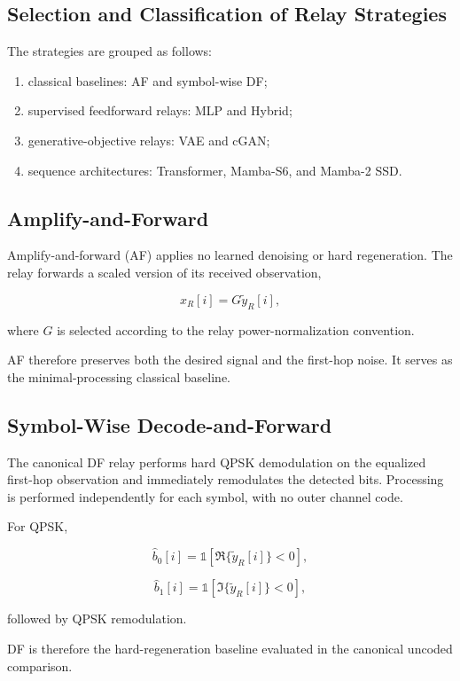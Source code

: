 \subsection{Selection and Classification of Relay Strategies}

The strategies are grouped as follows:

\begin{enumerate}
    \item classical baselines: AF and symbol-wise DF;
    \item supervised feedforward relays: MLP and Hybrid;
    \item generative-objective relays: VAE and cGAN;
    \item sequence architectures: Transformer, Mamba-S6, and
          Mamba-2 SSD.
\end{enumerate}


\subsection{Amplify-and-Forward}

Amplify-and-forward (AF) applies no learned denoising or hard
regeneration. The relay forwards a scaled version of its received
observation,

\[
x_R[i]
=
G\tilde y_R[i],
\]

where $G$ is selected according to the relay power-normalization
convention.

AF therefore preserves both the desired signal and the first-hop
noise. It serves as the minimal-processing classical baseline.


\subsection{Symbol-Wise Decode-and-Forward}

The canonical DF relay performs hard QPSK demodulation on the
equalized first-hop observation and immediately remodulates the
detected bits. Processing is performed independently for each symbol,
with no outer channel code.

For QPSK,

\[
\hat b_0[i]
=
\mathbb{1}
\left[
\Re\{\tilde y_R[i]\}<0
\right],
\]

\[
\hat b_1[i]
=
\mathbb{1}
\left[
\Im\{\tilde y_R[i]\}<0
\right],
\]

followed by QPSK remodulation.

DF is therefore the hard-regeneration baseline evaluated in the
canonical uncoded comparison.


